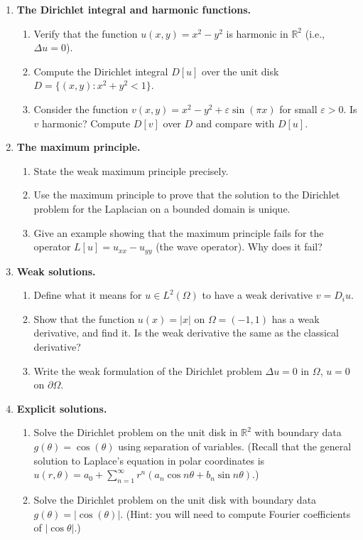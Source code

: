 \begin{enumerate}

    \item \textbf{The Dirichlet integral and harmonic functions.}
    \begin{enumerate}
        \item Verify that the function $u(x,y) = x^2 - y^2$ is harmonic in $\mathbb{R}^2$ (i.e., $\Delta u = 0$).
        \item Compute the Dirichlet integral $D[u]$ over the unit disk $D = \{(x,y) : x^2 + y^2 < 1\}$.
        \item Consider the function $v(x,y) = x^2 - y^2 + \varepsilon \sin(\pi x)$ for small $\varepsilon > 0$. Is $v$ harmonic? Compute $D[v]$ over $D$ and compare with $D[u]$.
    \end{enumerate}

    \item \textbf{The maximum principle.}
    \begin{enumerate}
        \item State the weak maximum principle precisely.
        \item Use the maximum principle to prove that the solution to the Dirichlet problem for the Laplacian on a bounded domain is unique.
        \item Give an example showing that the maximum principle fails for the operator $L[u] = u_{xx} - u_{yy}$ (the wave operator). Why does it fail?
    \end{enumerate}

    \item \textbf{Weak solutions.}
    \begin{enumerate}
        \item Define what it means for $u \in L^2(\Omega)$ to have a weak derivative $v = D_i u$.
        \item Show that the function $u(x) = |x|$ on $\Omega = (-1, 1)$ has a weak derivative, and find it. Is the weak derivative the same as the classical derivative?
        \item Write the weak formulation of the Dirichlet problem $\Delta u = 0$ in $\Omega$, $u = 0$ on $\partial\Omega$.
    \end{enumerate}

    \item \textbf{Explicit solutions.}
    \begin{enumerate}
        \item Solve the Dirichlet problem on the unit disk in $\mathbb{R}^2$ with boundary data $g(\theta) = \cos(\theta)$ using separation of variables. (Recall that the general solution to Laplace's equation in polar coordinates is $u(r,\theta) = a_0 + \sum_{n=1}^{\infty} r^n(a_n \cos n\theta + b_n \sin n\theta)$.)
        \item Solve the Dirichlet problem on the unit disk with boundary data $g(\theta) = |\cos(\theta)|$. (Hint: you will need to compute Fourier coefficients of $|\cos\theta|$.)
    \end{enumerate}


\end{enumerate}
